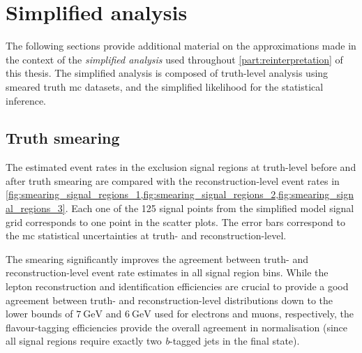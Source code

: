 
\chapter{Simplified analysis}


\graphicspath{{chapter-pmssm/Figs/Vector/}{chapter-pmssm/Figs/}}

The following sections provide additional material on the approximations made in the context of the \textit{simplified analysis} used throughout \cref{part:reinterpretation} of this thesis. The simplified analysis is composed of truth-level analysis using smeared truth \gls{mc} datasets, and the simplified likelihood for the statistical inference.

\section{Truth smearing}

The estimated event rates in the exclusion signal regions at truth-level before and after truth smearing are compared with the reconstruction-level event rates in \cref{fig:smearing_signal_regions_1,fig:smearing_signal_regions_2,fig:smearing_signal_regions_3}. Each one of the 125 signal points from the simplified model signal grid corresponds to one point in the scatter plots. The error bars correspond to the \gls{mc} statistical uncertainties at truth- and reconstruction-level.

The smearing significantly improves the agreement between truth- and reconstruction-level event rate estimates in all signal region bins. While the lepton reconstruction and identification efficiencies are crucial to provide a good agreement between truth- and reconstruction-level distributions down to the lower bounds of $\SI{7}{\GeV}$ and $\SI{6}{\GeV}$ used for electrons and muons, respectively, the flavour-tagging efficiencies provide the overall agreement in normalisation (since all signal regions require exactly two \textit{b}-tagged jets in the final state).


